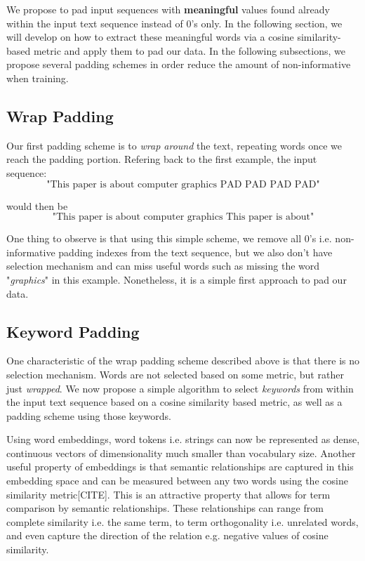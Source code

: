 We propose to pad input sequences with \textbf{meaningful} values found already within the
input text sequence instead of 0's only. In the following section, we will develop on how to
extract these meaningful words via a cosine similarity-based metric and apply them to pad
our data. In the following subsections, we propose several padding schemes in order reduce the amount of non-informative
when training.

\subsection{Wrap Padding}
Our first padding scheme is to \textit{wrap around} the text, repeating words once we reach the padding portion.
Refering back to the first example, the input sequence:
\[\text{"This paper is about computer graphics PAD PAD PAD PAD"}\]

would then be
\[\text{"This paper is about computer graphics This paper is about"}\]

One thing to observe is that using this simple scheme, we remove all 0's i.e. non-informative padding indexes
from the text sequence, but we also don't have selection mechanism and can miss useful words such as missing the
word "\textit{graphics}" in this example. Nonetheless, it is a simple first approach to pad our data.

\subsection{Keyword Padding}
One characteristic of the wrap padding scheme described above is that there is no selection mechanism. Words are not selected based on some metric,
but rather just \textit{wrapped}. We now propose a simple algorithm to select \textit{keywords} from within the input text sequence
based on a cosine similarity based metric, as well as a padding scheme using those keywords.

Using word embeddings, word tokens i.e. strings can now be represented as dense, continuous vectors of dimensionality much smaller than
vocabulary size. Another useful property of embeddings is that semantic relationships are captured
in this embedding space and can be measured between any two words using the cosine
similarity metric[CITE]. This is an attractive property that allows for term comparison
by semantic relationships. These relationships can range from complete similarity i.e. the
same term, to term orthogonality i.e. unrelated words, and even capture the direction of
the relation e.g. negative values of cosine similarity.

